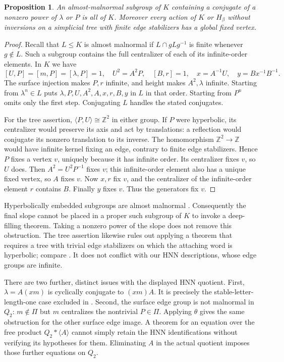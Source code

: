 \documentclass[11pt]{amsart}
\newtheorem{proposition}[theorem]{Proposition}
\theoremstyle{definition}
\theoremstyle{remark}
\newcommand{\Z}{\mathbb Z}
\begin{document}
\begin{proposition}\label{prop:tree-limits}
An almost-malnormal subgroup of $K$ containing a conjugate of a
nonzero power of $\lambda$ or $P$ is all of $K$. Moreover every
action of $K$ or $H_\beta$ without inversions on a simplicial tree
with finite edge stabilizers has a global fixed vertex.
\end{proposition}
\begin{proof}
Recall that $L\le K$ is almost malnormal if $L\cap gLg^{-1}$
is finite whenever $g\notin L$. Such a subgroup contains the full
centralizer of each of its infinite-order elements. In $K$ we have
\begin{equation}\label{eq:centralizer-chain}
 [U,P]=[m,P]=[\lambda,P]=1,\quad U^2=A^2P,\quad
 [B,r]=1,\quad x=A^{-1}U,\quad y=Bx^{-1}B^{-1}.
\end{equation}
The surface injection makes $P,r$ infinite, and height makes
$A^2,\lambda$ infinite. Starting from $\lambda^n\in L$ puts
$\lambda,P,U,A^2,A,x,r,B,y$ in $L$ in that order. Starting from
$P^n$ omits only the first step. Conjugating $L$ handles the stated
conjugates.

For the tree assertion, $\langle P,U\rangle\cong\Z^2$ in either
group. If $P$ were hyperbolic, its centralizer would preserve its axis
and act by translations: a reflection would conjugate its nonzero
translation to its inverse. The homomorphism $\Z^2\to\Z$ would have infinite
kernel fixing an edge, contrary to finite edge stabilizers. Hence
$P$ fixes a vertex $v$, uniquely because it has infinite order.
Its centralizer fixes $v$, so $U$ does. Then $A^2=U^2P^{-1}$
fixes $v$; this infinite-order element also has a unique fixed vertex,
so $A$ fixes $v$. Now $x,r$ fix $v$, and the centralizer of the
infinite-order element $r$ contains $B$. Finally $y$ fixes $v$.
Thus the generators fix $v$.
\end{proof}

Hyperbolically embedded subgroups are almost malnormal
\cite[Proposition 4.33]{DGO17}. Consequently the final slope cannot
be placed in a proper such subgroup of $K$ to invoke a deep-filling
theorem. Taking a nonzero power of the slope does not remove this
obstruction. The tree assertion likewise rules out applying a theorem
that requires a tree with trivial edge stabilizers on which the
attaching word is hyperbolic; compare \cite[Theorem 5.11]{ADL11}.
It does not conflict with our HNN descriptions, whose edge groups
are infinite.

There are two further, distinct issues with the displayed HNN quotient.
First, $\lambda=A(xm)$ is cyclically conjugate to $(xm)A$.
It is precisely the stable-letter-length-one case excluded in
\cite[Theorem 6.1]{Chen25}. Second, the surface edge group is not
malnormal in $Q_2$: $m\notin\Pi$ but $m$ centralizes the nontrivial
$P\in\Pi$. Applying $\theta$ gives the same obstruction for the
other surface edge image. A theorem for an equation over the free
product $Q_2*\langle A\rangle$ cannot simply retain the HNN
identifications without verifying its hypotheses for them. Eliminating
$A$ in the actual quotient imposes those further equations on $Q_2$.
\end{document}
